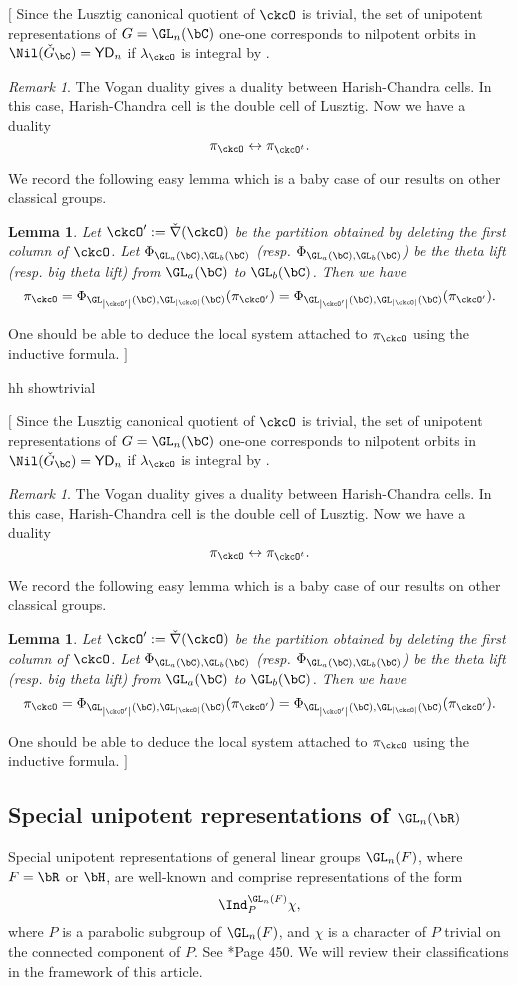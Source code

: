 \documentclass[12pt,a4paper]{amsart}
\newcommand{\trivial}[2][]{\if\relax\detokenize{#1}\relax
  {%
      \color{orange} \vspace{0em} $[$  #2 $]$
      \color{black}
  }
  \else
\ifx#1h
\ifcsname showtrivial\endcsname
{%
    \color{orange} \vspace{0em}  $[$ #2 $]$
    \color{black}
}
\fi
\else {\red Wrong argument!} \fi
\fi
}
\def\abs#1{\left|{#1}\right|}
\def\DDD{{\check\nabla}}
\numberwithin{equation}{section}
\newtheorem{lem}[thm]{Lemma}
\theoremstyle{remark}
\newtheorem{remark}[thm]{Remark}
\def\half{{\tfrac{1}{2}}}
\def\ckGc{\check{G}_{\bC}}
\def\YD{\mathsf{YD}}
\def\lamck{\lambda_\ckcO}
\begin{document}



\trivial[h]{
Since the Lusztig canonical quotient of $\ckcO$ is trivial, the set of unipotent representations
of $G = \GL_n(\bC)$ one-one corresponds to nilpotent orbits in
$\Nil(\ckGc) = \YD_{n}$ if $\lamck$ is integral by
\cite{BVUni}.


\begin{remark}
The Vogan duality gives a duality between Harish-Chandra cells.
In this case, Harish-Chandra cell is the double cell
of Lusztig.
Now we have a duality
\[
 \pi_\ckcO \leftrightarrow \pi_{\ckcO^t}.
\]
\end{remark}

We record the following easy lemma which is a baby case of our results on other
classical groups.
\begin{lem}
  Let $\ckcO' := \DDD(\ckcO)$ be the partition obtained by deleting the first
  column of $\ckcO$. Let $\Phi_{\GL_{a}(\bC),\GL_{b}(\bC)}$ (resp.
  $\Phi_{\GL_{a}(\bC),\GL_{b}(\bC)}$) be the theta lift (resp. big theta lift)
  from $\GL_a(\bC)$ to $\GL_b(\bC)$. Then we have
  \[
    \pi_{\ckcO} = \Phi_{\GL_{\abs{\ckcO'}}(\bC),\GL_{\abs{\ckcO}}(\bC)} (\pi_{\ckcO'})= \Phi_{\GL_{\abs{\ckcO'}}(\bC),\GL_{\abs{\ckcO}}(\bC)} (\pi_{\ckcO'}).
  \]
\end{lem}

One should be able to deduce the local system attached to $\pi_{\ckcO}$ using
the inductive formula.
}

\subsection{Special unipotent representations of $\GL_n(\bR)$}



Special unipotent representations of general linear groups $\GL_{n}(F)$, where $F= \bR$ or $\bH$, are well-known and comprise
representations of the form
\[
  \Ind_{P}^{\GL_{n}(F)}\chi,
\]
where $P$ is a parabolic subgroup of $\GL_{n}(F)$,
and $\chi$ is a character of $P$ trivial on the connected component of $P$. See \cite{V.GL}*{Page 450}. We will review their classifications in the framework of this article.


\end{document}
